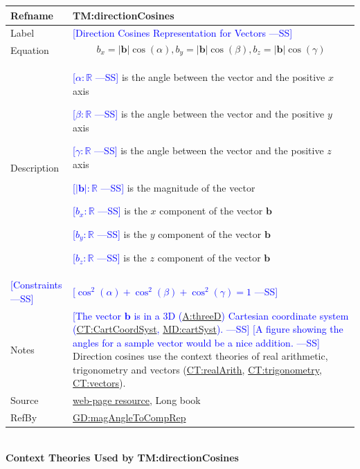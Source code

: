 \documentclass[12pt]{article}
\newcommand{\authornote}[3]{\textcolor{#1}{[#3 ---#2]}}
\newcommand{\authornote}[3]{}
\newcommand{\wss}[1]{\authornote{blue}{SS}{#1}}
\begin{document}
\medskip
\noindent
\begin{minipage}{\textwidth}
\begin{tabular}{>{\raggedright}p{}>{\raggedright\arraybackslash}p{}}
\toprule \textbf{Refname} & \textbf{TM:directionCosines}
\label{TM:directionCosines}
\\ \midrule
Label & \wss{Direction Cosines Representation for Vectors}
\\ \midrule   
Equation & \begin{displaymath}
           b_x = |\symbf{b}| \cos (\alpha), b_y = |\symbf{b}| \cos (\beta), b_z
           = |\symbf{b}| \cos (\gamma)
           \end{displaymath}
\\ \midrule
Description & \begin{symbDescription}
              \item \wss{$\alpha: \mathbb{R}$} is the angle between the vector and the positive $x$ axis 
              \item \wss{$\beta: \mathbb{R}$} is the angle between the vector and the positive $y$ axis 
              \item \wss{$\gamma: \mathbb{R}$} is the angle between the vector and the positive $z$ axis 
              \item \wss{$|\symbf{b}|: \mathbb{R}$} is the magnitude of the vector
              \item \wss{$b_x: \mathbb{R}$} is the $x$ component of the vector $\symbf{b}$
              \item \wss{$b_y: \mathbb{R}$} is the $y$ component of the vector $\symbf{b}$
              \item \wss{$b_z: \mathbb{R}$} is the $z$ component of the vector $\symbf{b}$
              \end{symbDescription}

\\ \midrule
\wss{Constraints} & \wss{$\cos^2(\alpha) + \cos^2(\beta) + \cos^2(\gamma) = 1$}

\\ \midrule
Notes & \wss{The vector $\symbf{b}$ is in a 3D (\hyperref[threeD]{A:threeD})
Cartesian coordinate system (\hyperref[CT:CartCoordSyst]{CT:CartCoordSyst},
\hyperref[MD:cartSyst]{MD:cartSyst}).}  \wss{A figure showing the angles for a
sample vector would be a nice addition.}  Direction cosines use the context
theories of real arithmetic, trigonometry and vectors
(\hyperref[CT:realArith]{CT:realArith},
\hyperref[CT:trigonometry]{CT:trigonometry}, \hyperref[CT:vectors]{CT:vectors}).

\\ \midrule
Source & \cite{} \href{https://byjus.com/maths/direction-cosines/} {web-page
resource}, Long book 
         
\\ \midrule
RefBy & \hyperref[GD:magAngleToCompRep]{GD:magAngleToCompRep}
        
\\ \bottomrule
\end{tabular}
\end{minipage}
~\\
\noindent \textbf{Context Theories Used by TM:directionCosines}
\end{document}
